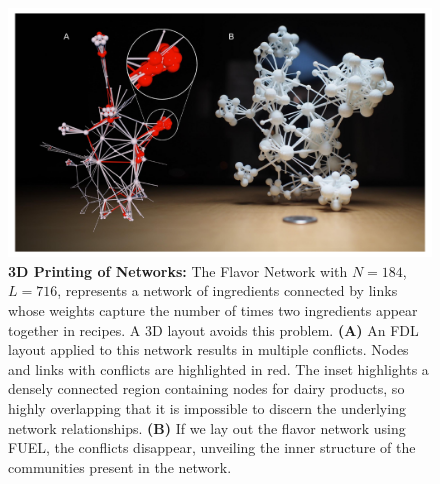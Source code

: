 \documentclass[endfloats,nofootinbib,preprint,floatfix,titlepage,superscriptaddress]{revtex4} %
\begin{document}
\begin{figure}
    \centering
    \includegraphics[width=\textwidth]{fig-09-19/3D-flavor-112117-1.pdf}
    \caption{\scriptsize {\bf 3D Printing of Networks:}
    The Flavor Network with $N=184$, $L=716$, represents a network of ingredients connected by links whose weights capture the number of times two ingredients appear together in recipes. 
    A 3D layout avoids this problem. 
    {\bf (A)} An FDL layout applied to this network results in multiple conflicts.
    Nodes and links with conflicts are highlighted in red. 
    The inset highlights a densely connected region containing nodes for dairy products,
    so highly overlapping that it is impossible to discern the underlying network relationships.
    {\bf (B)} If we lay out the flavor network using FUEL, the conflicts disappear, 
    unveiling the inner structure of the communities \cite{fortunato2010community}
    present in the network. 
}
\end{figure}
\end{document}
